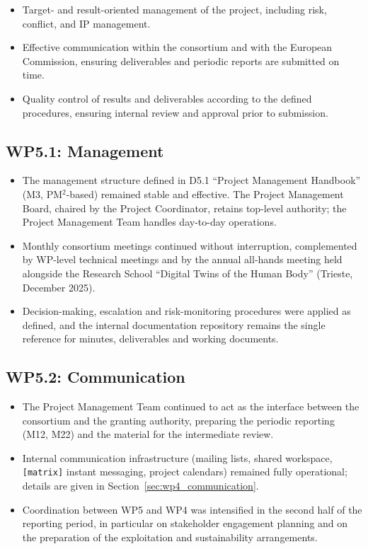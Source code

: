 \documentclass[a4paper,12pt, numbers]{article}
\begin{document}
\begin{itemize}[left=1em, itemsep=0pt, topsep=0pt]
\item Target- and result-oriented management of the project, including risk, conflict, and IP management.
\item Effective communication within the consortium and with the European Commission, ensuring deliverables and periodic reports are submitted on time.
\item Quality control of results and deliverables according to the defined procedures, ensuring internal review and approval prior to submission.
\end{itemize}

\subsection{WP5.1: Management}

\begin{itemize}[left=1em, itemsep=0pt, topsep=0pt]
	\item The management structure defined in D5.1 ``Project Management Handbook'' (M3, PM$^2$-based) remained stable and effective. The Project Management Board, chaired by the Project Coordinator, retains top-level authority; the Project Management Team handles day-to-day operations.
	\item Monthly consortium meetings continued without interruption, complemented by WP-level technical meetings and by the annual all-hands meeting held alongside the Research School ``Digital Twins of the Human Body'' (Trieste, December 2025).
	\item Decision-making, escalation and risk-monitoring procedures were applied as defined, and the internal documentation repository remains the single reference for minutes, deliverables and working documents.
\end{itemize}

\subsection{WP5.2: Communication}

\begin{itemize}[left=1em, itemsep=0pt, topsep=0pt]
	\item The Project Management Team continued to act as the interface between the consortium and the granting authority, preparing the periodic reporting (M12, M22) and the material for the intermediate review.
	\item Internal communication infrastructure (mailing lists, shared workspace, \texttt{[matrix]} instant messaging, project calendars) remained fully operational; details are given in Section~\ref{sec:wp4_communication}.
	\item Coordination between WP5 and WP4 was intensified in the second half of the reporting period, in particular on stakeholder engagement planning and on the preparation of the exploitation and sustainability arrangements.
\end{itemize}
\end{document}
